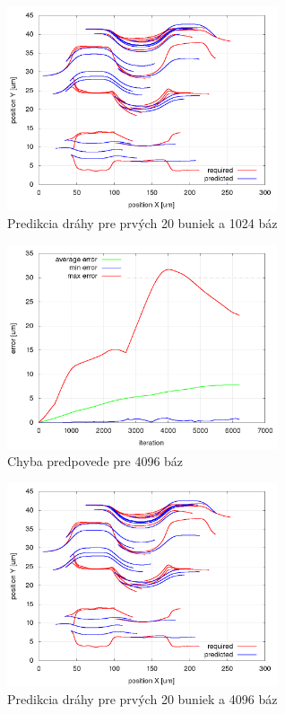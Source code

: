 \documentclass[10pt,a4paper]{article}
\begin{document}
\begin{figure}[!ht]
\centering
\includegraphics[width=8cm]{images/kanal_kika_sim6/1024_basis/trajectory_prediction_for_20_cells.png}
\caption{Predikcia dráhy pre prvých 20 buniek a 1024 báz}
\label{img:id_0_prediction_1024_basis}
\end{figure}

\begin{figure}[!ht]
\centering
\includegraphics[width=8cm]{images/kanal_kika_sim6/4096_basis/summary_error_during_trajectory_reconstruction.png}
\caption{Chyba predpovede pre 4096 báz}
\label{img:id_0_prediction_error_4096_basis}
\end{figure}

\begin{figure}[!ht]
\centering
\includegraphics[width=8cm]{images/kanal_kika_sim6/4096_basis/trajectory_prediction_for_20_cells.png}
\caption{Predikcia dráhy pre prvých 20 buniek a 4096 báz}
\label{img:id_0_prediction_4096_basis}
\end{figure}
\end{document}
